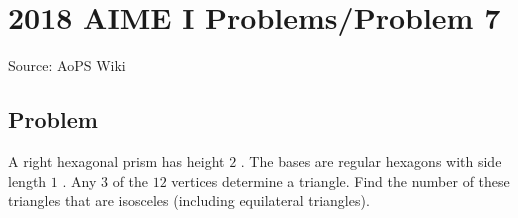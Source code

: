 \documentclass[12pt]{article}
\begin{document}
\section*{{2018 AIME I Problems/Problem 7}}
Source: AoPS Wiki

\subsection*{Problem}
A right hexagonal prism has height $2$ . The bases are regular hexagons with side length $1$ . Any $3$ of the $12$ vertices determine a triangle. Find the number of these triangles that are isosceles (including equilateral triangles).
\end{document}
